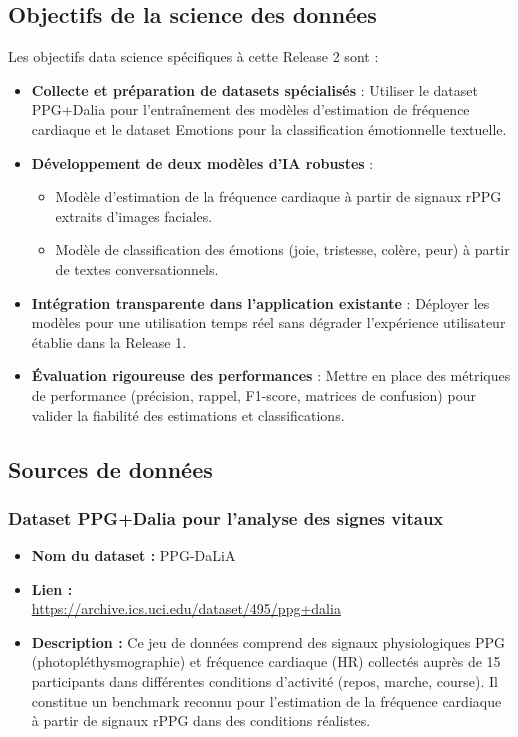 \subsection{Objectifs de la science des données}
Les objectifs data science spécifiques à cette Release 2 sont :
\begin{itemize}
    \item \textbf{Collecte et préparation de datasets spécialisés} : Utiliser le dataset PPG+Dalia pour l'entraînement des modèles d'estimation de fréquence cardiaque et le dataset Emotions pour la classification émotionnelle textuelle.
    
    \item \textbf{Développement de deux modèles d'IA robustes} :
    \begin{itemize}
        \item Modèle d'estimation de la fréquence cardiaque à partir de signaux rPPG extraits d'images faciales.
        \item Modèle de classification des émotions (joie, tristesse, colère, peur) à partir de textes conversationnels.
    \end{itemize}
    
    \item \textbf{Intégration transparente dans l'application existante} : Déployer les modèles pour une utilisation temps réel sans dégrader l'expérience utilisateur établie dans la Release 1.
    
    \item \textbf{Évaluation rigoureuse des performances} : Mettre en place des métriques de performance (précision, rappel, F1-score, matrices de confusion) pour valider la fiabilité des estimations et classifications.
\end{itemize}

\subsection{Sources de données}
\subsubsection*{Dataset PPG+Dalia pour l'analyse des signes vitaux}
\begin{itemize}
    \item \textbf{Nom du dataset :} PPG-DaLiA
    \item \textbf{Lien :} \\
    \url{https://archive.ics.uci.edu/dataset/495/ppg+dalia}
    \item \textbf{Description :} Ce jeu de données comprend des signaux physiologiques PPG (photopléthysmographie) et fréquence cardiaque (HR) collectés auprès de 15 participants dans différentes conditions d'activité (repos, marche, course). Il constitue un benchmark reconnu pour l'estimation de la fréquence cardiaque à partir de signaux rPPG dans des conditions réalistes.
\end{itemize}

